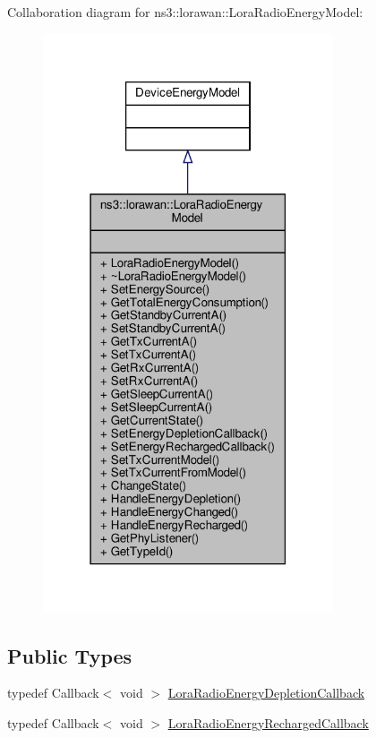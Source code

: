 Collaboration diagram for ns3\+:\+:lorawan\+:\+:Lora\+Radio\+Energy\+Model\+:
\nopagebreak
\begin{figure}[H]
\begin{center}
\leavevmode
\includegraphics[width=243pt]{classns3_1_1lorawan_1_1LoraRadioEnergyModel__coll__graph}
\end{center}
\end{figure}
\subsection*{Public Types}
\begin{DoxyCompactItemize}
\item 
typedef Callback$<$ void $>$ \hyperlink{classns3_1_1lorawan_1_1LoraRadioEnergyModel_a14be2fabbb8f8bab0e0c3c909f1f5662}{Lora\+Radio\+Energy\+Depletion\+Callback}
\item 
typedef Callback$<$ void $>$ \hyperlink{classns3_1_1lorawan_1_1LoraRadioEnergyModel_aa621913a2b37844d79e4033f85d650dc}{Lora\+Radio\+Energy\+Recharged\+Callback}
\end{DoxyCompactItemize}
